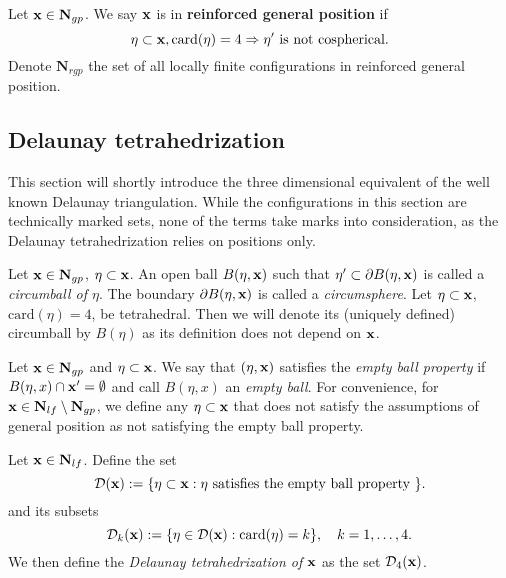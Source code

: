 \begin{definition}
Let ${\mathbf{x}} \in \mathbf N_{gp}$. We say ${\mathbf{x}}$ is in \textbf{reinforced general position} if 
$$ \eta \subset {\mathbf{x}}, \mathrm{card}(\eta) = 4 \Rightarrow \eta' \text{ is not cospherical.} $$   
Denote $\mathbf N_{rgp}$ the set of all locally finite configurations in reinforced general position.
\end{definition}


\subsection{Delaunay tetrahedrization}
This section will shortly introduce the three dimensional equivalent of the well known Delaunay triangulation. While the configurations in this section are technically marked sets, none of the terms take marks into consideration, as the Delaunay tetrahedrization relies on positions only.

\begin{definition}
	Let ${\mathbf{x}} \in \mathbf N_{gp}$, $\eta \subset {\mathbf{x}}$. An open ball $B(\eta,{\mathbf{x}})$ such that $\eta' \subset \partial B(\eta,{\mathbf{x}})$ is called a \textit{circumball of $\eta$}. The boundary $\partial B(\eta,{\mathbf{x}})$ is called a \textit{circumsphere}.
	Let $\eta\subset{\mathbf{x}}$, $\mathrm{card}(\eta)=4$, be tetrahedral. Then we will denote its (uniquely defined) circumball by $B(\eta)$ as its definition does not depend on ${\mathbf{x}}$. 
\end{definition}	

\begin{definition}
	Let ${\mathbf{x}} \in \mathbf N_{gp}$ and $\eta \subset {\mathbf{x}}$. We say that $(\eta,{\mathbf{x}})$ satisfies the \textit{empty ball property} if $B(\eta,x) \cap {\mathbf{x}}' = \emptyset$ and call $B(\eta,x)$ an \textit{empty ball}. 
	For convenience, for ${\mathbf{x}} \in \mathbf N_{lf}\setminus \mathbf N_{gp}$, we define any $\eta\subset {\mathbf{x}}$ that does not satisfy the assumptions of general position as not satisfying the empty ball property.
\end{definition}

\begin{definition}\label{def:Delaunay}
	Let ${\mathbf{x}} \in \mathbf N_{lf}$. Define the set 
	$$\mathcal {D}({\mathbf{x}}) := \{\eta\subset {\mathbf{x}}: \eta \text{ satisfies the empty ball property }\}.$$
	and its subsets
	$$\mathcal {D}_k({\mathbf{x}}) := \{\eta \in \mathcal {D}({\mathbf{x}}): \mathrm{card}(\eta)=k \},\quad k = 1,\dots,4.$$
	We then define the \textit{Delaunay tetrahedrization of ${\mathbf{x}}$} as the set $\mathcal D_4({\mathbf{x}})$. 
\end{definition}

